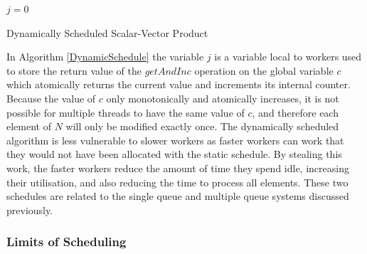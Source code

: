 \documentclass[12pt]{article}
\begin{document}
\IncMargin{1em}
\begin{algorithm}[H]
 \BlankLine

 $j = 0$\;
 \caption{Dynamically Scheduled Scalar-Vector Product}
 \label{DynamicSchedule}
\end{algorithm}
\DecMargin{1em}
\medskip

In Algorithm \ref{DynamicSchedule} the variable $j$ is a variable local to workers used to store the return value of the $getAndInc$ operation on the global variable $c$ which atomically returns the current value and increments its internal counter. Because the value of $c$ only monotonically and atomically increases, it is not possible for multiple threads to have the same value of $c$, and therefore each element of $N$ will only be modified exactly once. The dynamically scheduled algorithm is less vulnerable to slower workers as faster workers can  work that they would not have been allocated with the static schedule. By stealing this work, the faster workers reduce the amount of time they spend idle, increasing their utilisation, and also reducing the time to process all elements. These two schedules are related to the single queue and multiple queue systems discussed previously.

\subsubsection{Limits of Scheduling} \label{limits}
\end{document}
